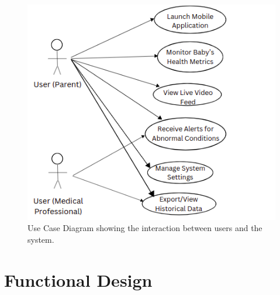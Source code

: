 \documentclass[12pt,a4paper]{report}
\begin{document}
\begin{figure}[hbtp]
  \centering
  \includegraphics[scale=0.6]{./pic/usercase.png}
  \caption{Use Case Diagram showing the interaction between users and the system.}
  \label{fig:usecase}
\end{figure}
\section{Functional Design}
\end{document}
